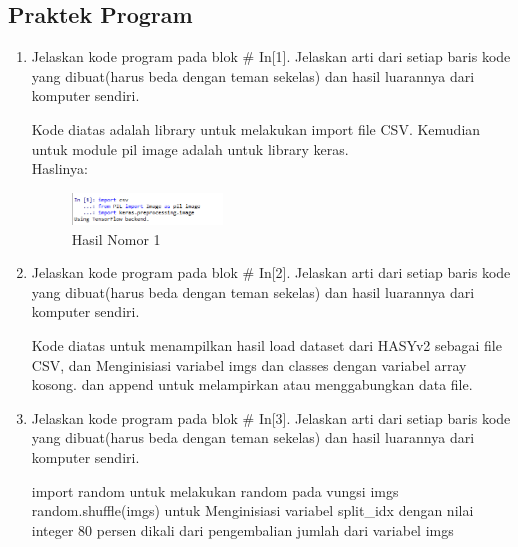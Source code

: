 \subsection{Praktek Program}
\begin{enumerate}

\item Jelaskan kode program pada blok \# In[1]. Jelaskan arti dari setiap baris kode
yang dibuat(harus beda dengan teman sekelas) dan hasil luarannya dari komputer sendiri.
	
	\hfill\break
	

Kode diatas adalah library untuk melakukan import file CSV. Kemudian untuk module pil image adalah untuk library keras.\\

Haslinya:\\

\begin{figure}
	\includegraphics[width=4cm]{figures/1174062/7/praktek1.png}
	\centering
	\caption{Hasil Nomor 1}
\end{figure}

\item Jelaskan kode program pada blok \# In[2]. Jelaskan arti dari setiap baris kode
yang dibuat(harus beda dengan teman sekelas) dan hasil luarannya dari komputer sendiri.

	\hfill\break
	

Kode diatas untuk menampilkan hasil load dataset dari HASYv2 sebagai file CSV, dan Menginisiasi variabel imgs dan classes dengan variabel array kosong. dan append untuk melampirkan atau menggabungkan data file.

\item Jelaskan kode program pada blok \# In[3]. Jelaskan arti dari setiap baris kode yang dibuat(harus beda dengan teman sekelas) dan hasil luarannya dari komputer sendiri.

	\hfill\break
	

import random untuk melakukan random pada vungsi imgs\\
random.shuffle(imgs) untuk Menginisiasi variabel split\_idx dengan nilai integer 80 persen dikali dari pengembalian jumlah dari variabel imgs\\


\end{enumerate}
